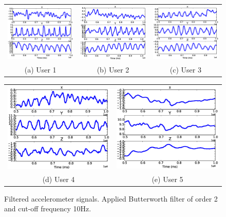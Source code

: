\begin{figure}[t]
\begin{center}
\begin{tabular}{ccc}
\includegraphics [width=.33\linewidth]{../fig/filer_sub1.eps}&
\includegraphics [width=.33\linewidth]{../fig/filer_sub8.eps}&
\includegraphics [width=.33\linewidth]{../fig/filer_sub3.eps}\\
(a) User 1& (b) User 2 & (c) User 3 \\
\end{tabular}

\begin{tabular}{cc}
\includegraphics [width=.33\linewidth]{../fig/filer_sub4.eps}&
\includegraphics [width=.33\linewidth]{../fig/filer_sub5.eps}\\
(d) User 4& (e) User 5 \\
\end{tabular}
\end{center}
\caption{Filtered accelerometer signals. Applied Butterworth
filter of order 2
and cut-off frequency 10Hz.\label{fig:filteredacc}}
\end{figure}


